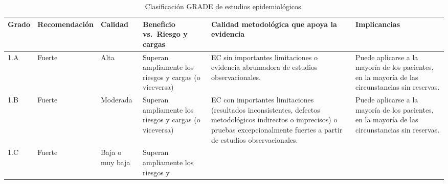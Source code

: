 \documentclass[
  spanish,
  a4paper,
]{scrbook}
\begin{document}
{

\begin{longtable}[]{@{}
  >{\raggedright\arraybackslash}p{}
  >{\raggedright\arraybackslash}p{}
  >{\raggedright\arraybackslash}p{}
  >{\raggedright\arraybackslash}p{}
  >{\raggedright\arraybackslash}p{}
  >{\raggedright\arraybackslash}p{}@{}}

\caption{\label{tbl-tab2}Clasificación GRADE de estudios
epidemiológicos.}

\tabularnewline

\toprule\noalign{}
\begin{minipage}[b]{\linewidth}\raggedright
Grado
\end{minipage} & \begin{minipage}[b]{\linewidth}\raggedright
Recomendación
\end{minipage} & \begin{minipage}[b]{\linewidth}\raggedright
Calidad
\end{minipage} & \begin{minipage}[b]{\linewidth}\raggedright
Beneficio vs.~Riesgo y cargas
\end{minipage} & \begin{minipage}[b]{\linewidth}\raggedright
Calidad metodológica que apoya la evidencia
\end{minipage} & \begin{minipage}[b]{\linewidth}\raggedright
Implicancias
\end{minipage} \\
\midrule\noalign{}
\endhead
\bottomrule\noalign{}
\endlastfoot
1.A & Fuerte & Alta & Superan ampliamente los riesgos y cargas (o
viceversa) & EC sin importantes limitaciones o evidencia abrumadora de
estudios observacionales. & Puede aplicarse a la mayoría de los
pacientes, en la mayoría de las circunstancias sin reservas. \\
1.B & Fuerte & Moderada & Superan ampliamente los riesgos y cargas (o
viceversa) & EC con importantes limitaciones (resultados inconsistentes,
defectos metodológicos indirectos o imprecisos) o pruebas
excepcionalmente fuertes a partir de estudios observacionales. & Puede
aplicarse a la mayoría de los pacientes, en la mayoría de las
circunstancias sin reservas. \\
1.C & Fuerte & Baja o muy baja & Superan ampliamente los riesgos y

\end{longtable}}
\end{document}
